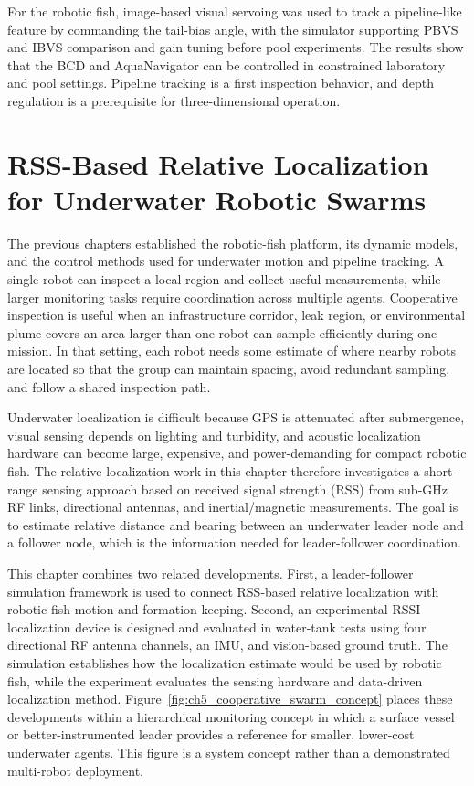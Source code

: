 \documentclass{uhcoethesis}
\begin{document}
For the robotic fish, image-based visual servoing was used to track a pipeline-like feature by commanding the tail-bias angle, with the simulator supporting PBVS and IBVS comparison and gain tuning before pool experiments. The results show that the BCD and AquaNavigator can be controlled in constrained laboratory and pool settings. Pipeline tracking is a first inspection behavior, and depth regulation is a prerequisite for three-dimensional operation.

\chapter{RSS-Based Relative Localization for Underwater Robotic Swarms}

The previous chapters established the robotic-fish platform, its dynamic models, and the control methods used for underwater motion and pipeline tracking. A single robot can inspect a local region and collect useful measurements, while larger monitoring tasks require coordination across multiple agents. Cooperative inspection is useful when an infrastructure corridor, leak region, or environmental plume covers an area larger than one robot can sample efficiently during one mission. In that setting, each robot needs some estimate of where nearby robots are located so that the group can maintain spacing, avoid redundant sampling, and follow a shared inspection path.

Underwater localization is difficult because GPS is attenuated after submergence, visual sensing depends on lighting and turbidity, and acoustic localization hardware can become large, expensive, and power-demanding for compact robotic fish. The relative-localization work in this chapter therefore investigates a short-range sensing approach based on received signal strength (RSS) from sub-GHz RF links, directional antennas, and inertial/magnetic measurements. The goal is to estimate relative distance and bearing between an underwater leader node and a follower node, which is the information needed for leader-follower coordination.

This chapter combines two related developments. First, a leader-follower simulation framework is used to connect RSS-based relative localization with robotic-fish motion and formation keeping. Second, an experimental RSSI localization device is designed and evaluated in water-tank tests using four directional RF antenna channels, an IMU, and vision-based ground truth. The simulation establishes how the localization estimate would be used by robotic fish, while the experiment evaluates the sensing hardware and data-driven localization method. Figure~\ref{fig:ch5_cooperative_swarm_concept} places these developments within a hierarchical monitoring concept in which a surface vessel or better-instrumented leader provides a reference for smaller, lower-cost underwater agents. This figure is a system concept rather than a demonstrated multi-robot deployment.
\end{document}
